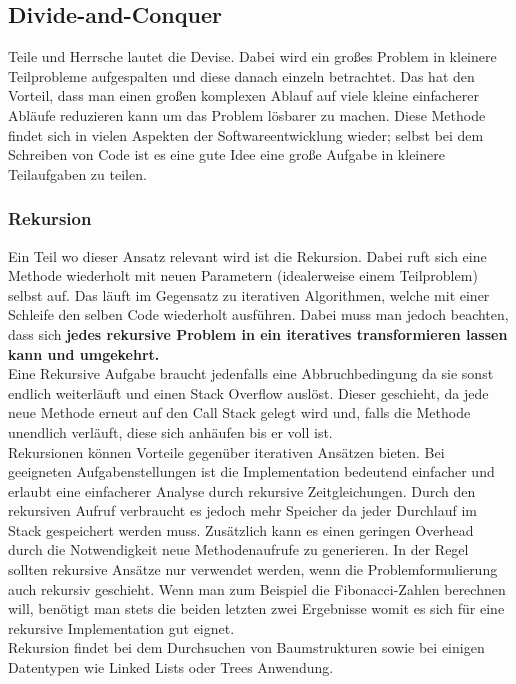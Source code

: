 \documentclass{article}
\begin{document}
	\subsection{Divide-and-Conquer}
	Teile und Herrsche lautet die Devise. Dabei wird ein großes Problem in kleinere Teilprobleme aufgespalten und diese danach einzeln betrachtet. Das hat den Vorteil, dass man einen großen komplexen Ablauf auf viele kleine einfacherer Abläufe reduzieren kann um das Problem lösbarer zu machen. Diese Methode findet sich in vielen Aspekten der Softwareentwicklung wieder; selbst bei dem Schreiben von Code ist es eine gute Idee eine große Aufgabe in kleinere Teilaufgaben zu teilen.
	\subsubsection{Rekursion}
	Ein Teil wo dieser Ansatz relevant wird ist die Rekursion. Dabei ruft sich eine Methode wiederholt mit neuen Parametern (idealerweise einem Teilproblem) selbst auf. Das läuft im Gegensatz zu iterativen Algorithmen, welche mit einer Schleife den selben Code wiederholt ausführen. Dabei muss man jedoch beachten, dass sich \textbf{jedes rekursive Problem in ein iteratives transformieren lassen kann und umgekehrt.} \\
	Eine Rekursive Aufgabe braucht jedenfalls eine Abbruchbedingung da sie sonst endlich weiterläuft und einen Stack Overflow auslöst. Dieser geschieht, da jede neue Methode erneut auf den Call Stack gelegt wird und, falls die Methode unendlich verläuft, diese sich anhäufen bis er voll ist. \\
	Rekursionen können Vorteile gegenüber iterativen Ansätzen bieten. Bei geeigneten Aufgabenstellungen ist die Implementation bedeutend einfacher und erlaubt eine einfacherer Analyse durch rekursive Zeitgleichungen. Durch den rekursiven Aufruf verbraucht es jedoch mehr Speicher da jeder Durchlauf im Stack gespeichert werden muss. Zusätzlich kann es einen geringen Overhead durch die Notwendigkeit neue Methodenaufrufe zu generieren. In der Regel sollten rekursive Ansätze nur verwendet werden, wenn die Problemformulierung auch rekursiv geschieht. Wenn man zum Beispiel die Fibonacci-Zahlen berechnen will, benötigt man stets die beiden letzten zwei Ergebnisse womit es sich für eine rekursive Implementation gut eignet. \\
	Rekursion findet bei dem Durchsuchen von Baumstrukturen sowie bei einigen Datentypen wie Linked Lists oder Trees Anwendung.
\end{document}
